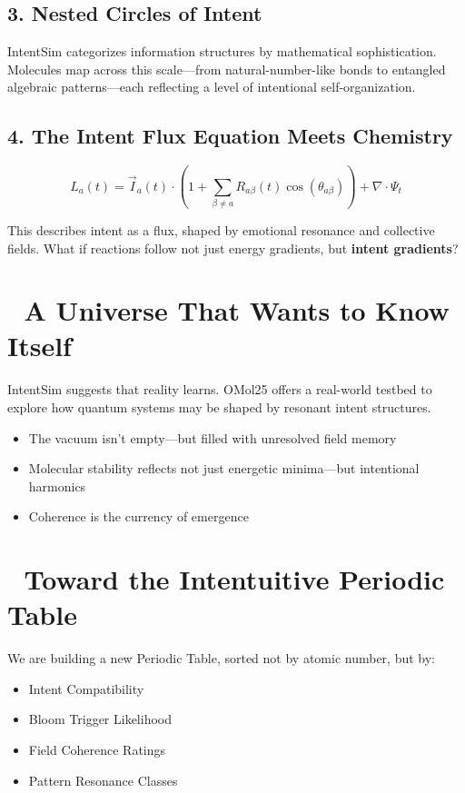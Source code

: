 \documentclass[12pt]{article}
\begin{document}
\subsection*{3. Nested Circles of Intent}
IntentSim categorizes information structures by mathematical sophistication. Molecules map across this scale—from natural-number-like bonds to entangled algebraic patterns—each reflecting a level of intentional self-organization.

\subsection*{4. The Intent Flux Equation Meets Chemistry}
\[
L_a(t) = \vec{I}_a(t) \cdot \left(1 + \sum_{\beta \ne a} R_{a\beta}(t)\cos(\theta_{a\beta})\right) + \nabla \cdot \Psi_t
\]

This describes intent as a flux, shaped by emotional resonance and collective fields. What if reactions follow not just energy gradients, but \textbf{intent gradients}?

\section*{🌌 A Universe That Wants to Know Itself}

IntentSim suggests that reality learns. OMol25 offers a real-world testbed to explore how quantum systems may be shaped by resonant intent structures.

\begin{itemize}
  \item The vacuum isn't empty—but filled with unresolved field memory
  \item Molecular stability reflects not just energetic minima—but intentional harmonics
  \item Coherence is the currency of emergence
\end{itemize}

\section*{🧭 Toward the Intentuitive Periodic Table}

We are building a new Periodic Table, sorted not by atomic number, but by:

\begin{itemize}
  \item Intent Compatibility
  \item Bloom Trigger Likelihood
  \item Field Coherence Ratings
  \item Pattern Resonance Classes
\end{itemize}
\end{document}
